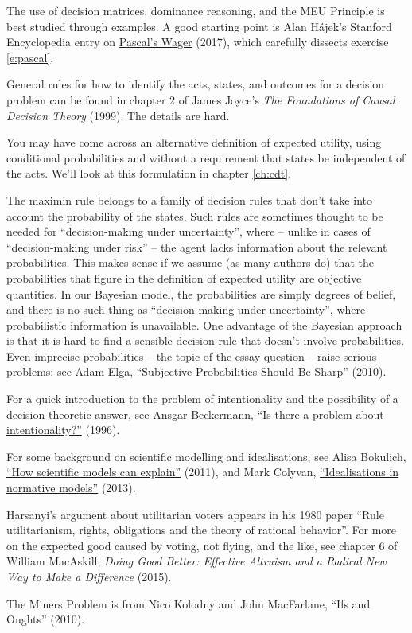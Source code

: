 \begin{sources}
  
  The use of decision matrices, dominance reasoning, and the MEU Principle is
  best studied through examples. A good starting point is Alan H\'ajek's Stanford
  Encyclopedia entry on
  \href{http://plato.stanford.edu/entries/pascal-wager/}{Pascal's Wager} (2017),
  which carefully dissects exercise \ref{e:pascal}.
  
  General rules for how to identify the acts, states, and outcomes for a decision
  problem can be found in chapter 2 of James Joyce's \emph{The Foundations of
    Causal Decision Theory} (1999). The details are hard.

  You may have come across an alternative definition of expected utility, using
  conditional probabilities and without a requirement that states be independent
  of the acts. We'll look at this formulation in chapter \ref{ch:cdt}.

  The maximin rule belongs to a family of decision rules that don't take into
  account the probability of the states. Such rules are sometimes thought to be
  needed for ``decision-making under uncertainty'', where -- unlike in cases of
  ``decision-making under risk'' -- the agent lacks information about the
  relevant probabilities.\label{p:frequentist-dt} This makes sense if we assume
  (as many authors do) that the probabilities that figure in the definition of
  expected utility are objective quantities. In our Bayesian model, the
  probabilities are simply degrees of belief, and there is no such thing as
  ``decision-making under uncertainty'', where probabilistic information is
  unavailable. One advantage of the Bayesian approach is that it is hard to find
  a sensible decision rule that doesn't involve probabilities. Even imprecise
  probabilities -- the topic of the essay question -- raise serious problems:
  see Adam Elga, ``Subjective Probabilities Should Be Sharp'' (2010).
  
  For a quick introduction to the problem of intentionality and the possibility of a decision-theoretic answer, see Ansgar Beckermann,
  \href{https://www.uni-bielefeld.de/(en)/philosophie/personen/beckermann/pbint_ve.pdf}{``Is
    there a problem about intentionality?''} (1996).
  
  For some background on scientific modelling and idealisations, see Alisa Bokulich,
  \href{http://www.romanfrigg.org/Links/MS2/Bokulich.pdf}{``How scientific
    models can explain''} (2011), and Mark Colyvan,
  \href{http://www.colyvan.com/papers/iinm.pdf}{``Idealisations in normative
    models''} (2013).

  Harsanyi's argument about utilitarian voters appears in his 1980 paper ``Rule
  utilitarianism, rights, obligations and the theory of rational behavior''. For
  more on the expected good caused by voting, not flying, and the like,
  see chapter 6 of William MacAskill, \emph{Doing Good Better: Effective
    Altruism and a Radical New Way to Make a Difference} (2015).

  The Miners Problem is from Nico Kolodny and John MacFarlane, ``Ifs
  and Oughts'' (2010).

\end{sources}


